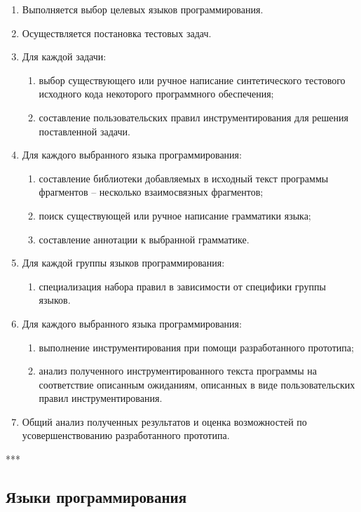 \begin{enumerate}[label=\arabic*]
  \item Выполняется выбор целевых языков программирования.
  \item Осуществляется постановка тестовых задач.
  \item Для каждой задачи:
    \begin{enumerate}[label*=.\arabic*]
      \item выбор существующего или ручное написание синтетического тестового исходного кода некоторого программного обеспечения;
      \item составление пользовательских правил инструментирования для решения поставленной задачи.
    \end{enumerate}
  \item Для каждого выбранного языка программирования:
  \begin{enumerate}[label*=.\arabic*]
    \item составление библиотеки добавляемых в исходный текст программы фрагментов -- несколько взаимосвязных фрагментов;
    \item поиск существующей или ручное написание грамматики языка;
    \item составление аннотации к выбранной грамматике.
  \end{enumerate}
  \item Для каждой группы языков программирования:
  \begin{enumerate}[label*=.\arabic*]
    \item специализация набора правил в зависимости от специфики группы языков.
  \end{enumerate}
  \item Для каждого выбранного языка программирования:
  \begin{enumerate}[label*=.\arabic*]
    \item выполнение инструментирования при помощи разработанного прототипа;
    \item анализ полученного инструментированного текста программы на соответствие описанным ожиданиям, описанных в виде пользовательских правил инструментирования.
  \end{enumerate}
  \item Общий анализ полученных результатов и оценка возможностей по усовершенствованию разработанного прототипа.
\end{enumerate}

***

\subsection{Языки программирования}

